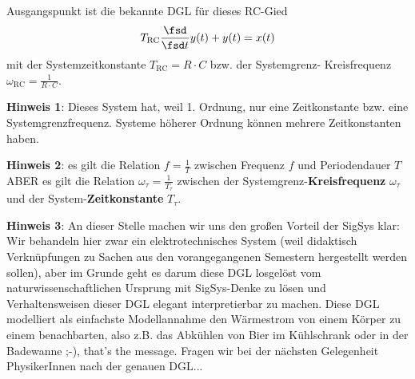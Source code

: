 \begin{Ansatz}
Ausgangspunkt ist die bekannte DGL für dieses RC-Gied
\begin{align}
T_\mathrm{RC}\frac{\fsd}{\fsd t} y(t) + y(t) = x(t)
\end{align}
mit der Systemzeitkonstante $T_\mathrm{RC}=R \cdot C$ bzw. der Systemgrenz-
Kreisfrequenz $\omega_\mathrm{RC}=\frac{1}{R \cdot C}$.
%

\noindent\textbf{Hinweis 1}: Dieses System hat, weil 1. Ordnung, nur eine
Zeitkonstante bzw. eine Systemgrenzfrequenz.
Systeme höherer Ordnung können mehrere Zeitkonstanten haben.

\noindent\textbf{Hinweis 2}: es gilt die
Relation $f=\frac{1}{T}$ zwischen Frequenz $f$ und Periodendauer $T$ ABER
es gilt die Relation $\omega_\tau = \frac{1}{T_\tau}$ zwischen der Systemgrenz-\textbf{Kreisfrequenz}
$\omega_\tau $ und der System-\textbf{Zeitkonstante} $T_\tau $.

\noindent \textbf{Hinweis 3}:
An dieser Stelle machen wir uns den großen Vorteil der SigSys klar:
%
Wir behandeln hier zwar ein elektrotechnisches System (weil didaktisch
Verknüpfungen zu Sachen aus den vorangegangenen Semestern hergestellt werden
sollen), aber im Grunde geht es darum diese DGL losgelöst vom naturwissenschaftlichen
Ursprung mit SigSys-Denke zu lösen und Verhaltensweisen dieser DGL elegant
interpretierbar zu machen.
%
Diese DGL modelliert als einfachste Modellannahme den Wärmestrom von einem Körper
zu einem benachbarten, also z.B. das Abkühlen von Bier im Kühlschrank
oder in der Badewanne ;-), that's the message. Fragen wir bei der nächsten
Gelegenheit PhysikerInnen nach der genauen DGL...
\end{Ansatz}

